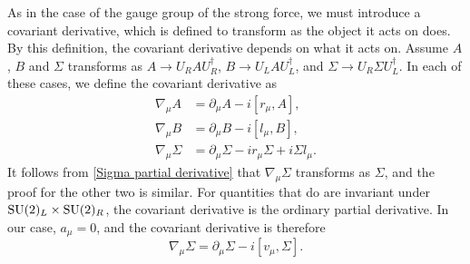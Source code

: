 As in the case of the gauge group of the strong force, we must introduce a covariant derivative, which is defined to transform as the object it acts on does.
By this definition, the covariant derivative depends on what it acts on.
Assume $A$, $B$ and $\Sigma$ transforms as $A \rightarrow U_R A U_R^\dagger$, $B \rightarrow U_L A U_L^\dagger$, and $\Sigma \rightarrow U_R \Sigma U_L^\dagger$.
In each of these cases, we define the covariant derivative as
\begin{align}
    \label{covariant derivative general}
    \nabla_\mu A &= \partial_\mu A - i [r_\mu, A], \\
    \nabla_\mu B &= \partial_\mu B - i [l_\mu, B], \\
    \nabla_\mu \Sigma &= \partial_\mu \Sigma - i r_\mu \Sigma + i \Sigma l_\mu.
\end{align}
It follows from \cref{Sigma partial derivative} that $\nabla_\mu \Sigma$ transforms as $\Sigma$, and the proof for the other two is similar.
For quantities that do are invariant under $\mathrm{SU}(2)_L\times \mathrm{SU}(2)_R$, the covariant derivative is the ordinary partial derivative.
In our case, $a_\mu = 0$, and the covariant derivative is therefore
\begin{equation}
    \nabla_\mu \Sigma = \partial_\mu \Sigma - i [v_\mu, \Sigma].
\end{equation}

